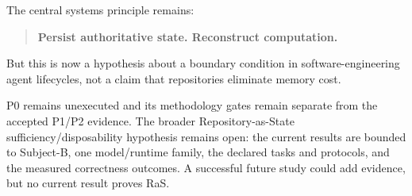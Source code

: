 The central systems principle remains:
\begin{quote}
\textbf{Persist authoritative state. Reconstruct computation.}
\end{quote}

But this is now a hypothesis about a boundary condition in software-engineering agent lifecycles, not a claim that repositories eliminate memory cost.

P0 remains unexecuted and its methodology gates remain separate from the accepted P1/P2 evidence. The broader Repository-as-State sufficiency/disposability hypothesis remains open: the current results are bounded to Subject-B, one model/runtime family, the declared tasks and protocols, and the measured correctness outcomes. A successful future study could add evidence, but no current result proves RaS.
